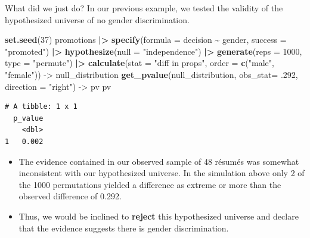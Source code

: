 \documentclass[
  ignorenonframetext,
]{beamer}
\newenvironment{Shaded}{\begin{snugshade}}{\end{snugshade}}
\newcommand{\AttributeTok}[1]{\textcolor[rgb]{0.13,0.29,0.53}{#1}}
\newcommand{\DecValTok}[1]{\textcolor[rgb]{0.00,0.00,0.81}{#1}}
\newcommand{\FunctionTok}[1]{\textcolor[rgb]{0.13,0.29,0.53}{\textbf{#1}}}
\newcommand{\NormalTok}[1]{#1}
\newcommand{\OtherTok}[1]{\textcolor[rgb]{0.56,0.35,0.01}{#1}}
\newcommand{\SpecialCharTok}[1]{\textcolor[rgb]{0.81,0.36,0.00}{\textbf{#1}}}
\newcommand{\StringTok}[1]{\textcolor[rgb]{0.31,0.60,0.02}{#1}}
\begin{document}
\begin{frame}[fragile]{What did we just do?}
\label{what-did-we-just-do-1}
In our previous example, we tested the validity of the hypothesized
universe of no gender discrimination.

\tiny

\begin{Shaded}
\begin{Highlighting}[]
\FunctionTok{set.seed}\NormalTok{(}\DecValTok{37}\NormalTok{)}
\NormalTok{promotions }\SpecialCharTok{|\textgreater{}} 
  \FunctionTok{specify}\NormalTok{(}\AttributeTok{formula =}\NormalTok{ decision }\SpecialCharTok{\textasciitilde{}}\NormalTok{ gender, }\AttributeTok{success =} \StringTok{"promoted"}\NormalTok{) }\SpecialCharTok{|\textgreater{}} 
  \FunctionTok{hypothesize}\NormalTok{(}\AttributeTok{null =} \StringTok{"independence"}\NormalTok{) }\SpecialCharTok{|\textgreater{}} 
  \FunctionTok{generate}\NormalTok{(}\AttributeTok{reps =} \DecValTok{1000}\NormalTok{, }\AttributeTok{type =} \StringTok{"permute"}\NormalTok{) }\SpecialCharTok{|\textgreater{}} 
  \FunctionTok{calculate}\NormalTok{(}\AttributeTok{stat =} \StringTok{"diff in props"}\NormalTok{, }\AttributeTok{order =} \FunctionTok{c}\NormalTok{(}\StringTok{"male"}\NormalTok{, }\StringTok{"female"}\NormalTok{)) }\OtherTok{{-}\textgreater{}}\NormalTok{ null\_distribution}
\FunctionTok{get\_pvalue}\NormalTok{(null\_distribution, }\AttributeTok{obs\_stat=}\NormalTok{ .}\DecValTok{292}\NormalTok{, }\AttributeTok{direction =} \StringTok{"right"}\NormalTok{) }\OtherTok{{-}\textgreater{}}\NormalTok{ pv}
\NormalTok{pv}
\end{Highlighting}
\end{Shaded}

\begin{verbatim}
# A tibble: 1 x 1
  p_value
    <dbl>
1   0.002
\end{verbatim}

\normalsize

\begin{itemize}
\item
  The evidence contained in our observed sample of 48 résumés was
  somewhat inconsistent with our hypothesized universe. In the
  simulation above only 2 of the 1000 permutations yielded a difference
  as extreme or more than the observed difference of 0.292.
\item
  Thus, we would be inclined to \textbf{reject} this hypothesized
  universe and declare that the evidence suggests there is gender
  discrimination.
\end{itemize}
\end{frame}
\end{document}
